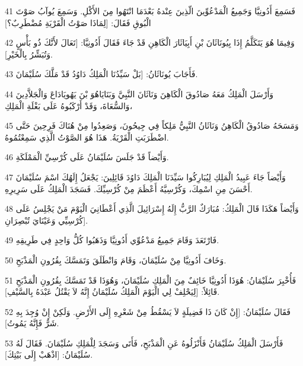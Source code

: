 \par 41 فَسَمِعَ أَدُونِيَّا وَجَمِيعُ الْمَدْعُوِّينَ الّذِينَ عِنْدهُ بَعْدَمَا انْتَهُوا مِنَ الأَكْلِ. وَسَمِعَ يُوآبُ صَوْتَ الْبُوقِ فَقَالَ: [لِمَاذَا صَوْتُ الْقَرْيَةِ مُضْطَرِبٌ؟]
\par 42 وَفِيمَا هُوَ يَتَكَلَّمُ إِذَا بِيُونَاثَانَ بْنِ أَبِيَاثَارَ الْكَاهِنِ قَدْ جَاءَ فَقَالَ أَدُونِيَّا: [تَعَالَ لأَنَّكَ ذُو بَأْسٍ وَتُبَشِّرُ بِالْخَيْرِ].
\par 43 فَأَجَابَ يُونَاثَانُ: [بَلْ سَيِّدُنَا الْمَلِكُ دَاوُدُ قَدْ مَلَّكَ سُلَيْمَانَ.
\par 44 وَأَرْسَلَ الْمَلِكُ مَعَهُ صَادُوقَ الْكَاهِنَ وَنَاثَانَ النَّبِيَّ وَبَنَايَاهُوَ بْنَ يَهُويَادَاعَ وَالْجَلاَّدِينَ وَالسُّعَاةَ، وَقَدْ أَرْكَبُوهُ عَلَى بَغْلَةِ الْمَلِكِ،
\par 45 وَمَسَحَهُ صَادُوقُ الْكَاهِنُ وَنَاثَانُ النَّبِيُّ مَلِكاً فِي جِيحُونَ، وَصَعِدُوا مِنْ هُنَاكَ فَرِحِينَ حَتَّى اضْطَرَبَتِ الْقَرْيَةُ. هَذَا هُوَ الصَّوْتُ الَّذِي سَمِعْتُمُوهُ.
\par 46 وَأَيْضاً قَدْ جَلَسَ سُلَيْمَانُ عَلَى كُرْسِيِّ الْمَمْلَكَةِ.
\par 47 وَأَيْضاً جَاءَ عَبِيدُ الْمَلِكِ لِيُبَارِكُوا سَيِّدَنَا الْمَلِكَ دَاوُدَ قَائِلِينَ: يَجْعَلُ إِلَهُكَ اسْمَ سُلَيْمَانَ أَحْسَنَ مِنِ اسْمِكَ، وَكُرْسِيَّهُ أَعْظَمَ مِنْ كُرْسِيِّكَ. فَسَجَدَ الْمَلِكُ عَلَى سَرِيرِهِ.
\par 48 وَأَيْضاً هَكَذَا قَالَ الْمَلِكُ: مُبَارَكٌ الرَّبُّ إِلَهُ إِسْرَائِيلَ الَّذِي أَعْطَانِيَ الْيَوْمَ مَنْ يَجْلِسُ عَلَى كُرْسِيِّي وَعَيْنَايَ تُبْصِرَانِ].
\par 49 فَارْتَعَدَ وَقَامَ جَمِيعُ مَدْعُوِّي أَدُونِيَّا وَذَهَبُوا كُلُّ وَاحِدٍ فِي طَرِيقِهِ.
\par 50 وَخَافَ أَدُونِيَّا مِنْ سُلَيْمَانَ، وَقَامَ وَانْطَلَقَ وَتَمَسَّكَ بِقُرُونِ الْمَذْبَحِ.
\par 51 فَأُخْبِرَ سُلَيْمَانُ: هُوَذَا أَدُونِيَّا خَائِفٌ مِنَ الْمَلِكِ سُلَيْمَانَ، وَهُوَذَا قَدْ تَمَسَّكَ بِقُرُونِ الْمَذْبَحِ قَائِلاً: [لِيَحْلِفْ لِي الْيَوْمَ الْمَلِكُ سُلَيْمَانُ إِنَّهُ لاَ يَقْتُلُ عَبْدَهُ بِالسَّيْفِ].
\par 52 فَقَالَ سُلَيْمَانُ: [إِنْ كَانَ ذَا فَضِيلَةٍ لاَ يَسْقُطُ مِنْ شَعْرِهِ إِلَى الأَرْضِ. وَلَكِنْ إِنْ وُجِدَ بِهِ شَرٌّ فَإِنَّهُ يَمُوتُ].
\par 53 فَأَرْسَلَ الْمَلِكُ سُلَيْمَانُ فَأَنْزَلُوهُ عَنِ الْمَذْبَحِ، فَأَتَى وَسَجَدَ لِلْمَلِكِ سُلَيْمَانَ. فَقَالَ لَهُ سُلَيْمَانُ: [اذْهَبْ إِلَى بَيْتِكَ].

